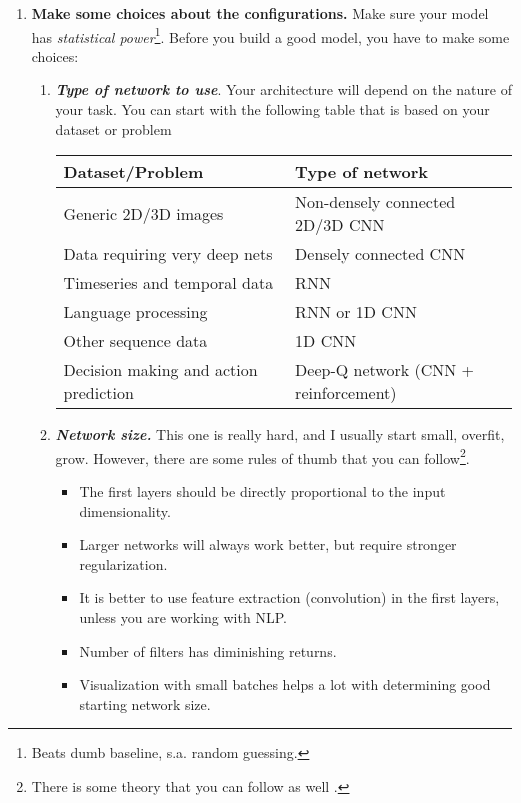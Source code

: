 \begin{enumerate}
\item {\bf Make some choices about the configurations.}
Make sure your model has {\em statistical power}\footnote{Beats dumb baseline, s.a. random guessing.}.
Before you build a good model, you have to make some choices:
\begin{enumerate}
\item {\bfseries\em Type of network to use}.
Your architecture will depend on the nature of your task.
You can start with the following table that is based on your dataset or problem
\begin{center}
\begin{tabular}{ l l}
 Dataset/Problem & Type of network \\
 \hline
 Generic 2D/3D images & Non-densely connected 2D/3D CNN \\
 Data requiring very deep nets & Densely connected CNN\footnotemark \\
 Timeseries and temporal data & RNN \\
 Language processing & RNN or 1D CNN \\
 Other sequence data & 1D CNN \\
 Decision making and action prediction & Deep-Q network (CNN + reinforcement)
\end{tabular}
\end{center}
\item {\bfseries\em Network size.}
This one is really hard, and I usually start small, overfit, grow.
However, there are some rules of thumb that you can follow\footnote{There is some theory that you can follow as well \cite{wiki:vc}.}.
    \begin{itemize}
    \item The first layers should be directly proportional to the input dimensionality.
    \item Larger networks will always work better, but require stronger regularization.
    \item It is better to use feature extraction (convolution) in the first layers, unless you are working with NLP.
    \item Number of filters has diminishing returns.
    \item Visualization with small batches helps a lot with determining good starting network size.

\end{itemize}
\end{enumerate}
\end{enumerate}
